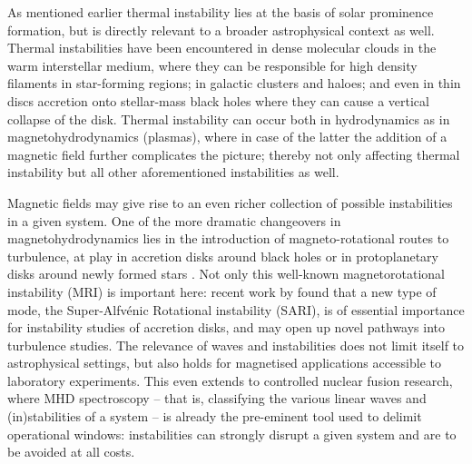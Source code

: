 As mentioned earlier thermal instability lies at the basis of solar prominence formation, but is directly relevant to a broader astrophysical context as well. Thermal instabilities have been encountered in dense molecular clouds in the warm interstellar medium, where they can be responsible for high density filaments in star-forming regions; in galactic clusters and haloes; and even in thin discs accretion onto stellar-mass black holes where they can cause a vertical collapse of the disk. Thermal instability can occur both in hydrodynamics as in magnetohydrodynamics (plasmas), where in case of the latter the addition of a magnetic field further complicates the picture; thereby not only affecting thermal instability but all other aforementioned instabilities as well.

Magnetic fields may give rise to an even richer collection of possible instabilities in a given system. One of the more dramatic changeovers in magnetohydrodynamics lies in the introduction of magneto-rotational routes to turbulence, at play in accretion disks around black holes or in protoplanetary disks around newly formed stars \citep{balbus1991}. Not only this well-known magnetorotational instability (MRI) is important here: recent work by \citet{goedbloed2022_sari} found that a new type of mode, the Super-Alfv\'enic Rotational instability (SARI), is of essential importance for instability studies of accretion disks, and may open up novel pathways into turbulence studies.
The relevance of waves and instabilities does not limit itself to astrophysical settings, but also holds for magnetised applications accessible to laboratory experiments. This even extends to controlled nuclear fusion research, where MHD spectroscopy -- that is, classifying the various linear waves and (in)stabilities of a system -- is already the pre-eminent tool used to delimit operational windows: instabilities can strongly disrupt a given system and are to be avoided at all costs.


